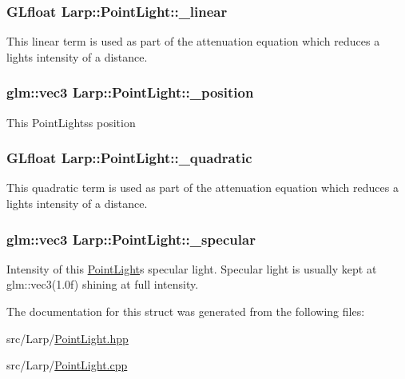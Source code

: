 \subsubsection[{\texorpdfstring{\+\_\+linear}{_linear}}]{\setlength{\rightskip}{0pt plus 5cm}G\+Lfloat Larp\+::\+Point\+Light\+::\+\_\+linear}\hypertarget{structLarp_1_1PointLight_ad1c64e128dbc6edc2b5a2cb373a3e3dc}{}\label{structLarp_1_1PointLight_ad1c64e128dbc6edc2b5a2cb373a3e3dc}
This linear term is used as part of the attenuation equation which reduces a light\textquotesingle{}s intensity of a distance. 
\subsubsection[{\texorpdfstring{\+\_\+position}{_position}}]{\setlength{\rightskip}{0pt plus 5cm}glm\+::vec3 Larp\+::\+Point\+Light\+::\+\_\+position}\hypertarget{structLarp_1_1PointLight_a5a5dfbb7a5f9225264de04c7f2057188}{}\label{structLarp_1_1PointLight_a5a5dfbb7a5f9225264de04c7f2057188}
This Point\+Lights\textquotesingle{}s position 
\subsubsection[{\texorpdfstring{\+\_\+quadratic}{_quadratic}}]{\setlength{\rightskip}{0pt plus 5cm}G\+Lfloat Larp\+::\+Point\+Light\+::\+\_\+quadratic}\hypertarget{structLarp_1_1PointLight_af4385e38db129e0fc4b1af9c8bd6bfec}{}\label{structLarp_1_1PointLight_af4385e38db129e0fc4b1af9c8bd6bfec}
This quadratic term is used as part of the attenuation equation which reduces a light\textquotesingle{}s intensity of a distance. 
\subsubsection[{\texorpdfstring{\+\_\+specular}{_specular}}]{\setlength{\rightskip}{0pt plus 5cm}glm\+::vec3 Larp\+::\+Point\+Light\+::\+\_\+specular}\hypertarget{structLarp_1_1PointLight_a9f649b8dba0654cec63d2ae78c981706}{}\label{structLarp_1_1PointLight_a9f649b8dba0654cec63d2ae78c981706}
Intensity of this \hyperlink{structLarp_1_1PointLight}{Point\+Light}\textquotesingle{}s specular light. Specular light is usually kept at glm\+::vec3(1.\+0f) shining at full intensity. 

The documentation for this struct was generated from the following files\+:\begin{DoxyCompactItemize}
\item 
src/\+Larp/\hyperlink{PointLight_8hpp}{Point\+Light.\+hpp}\item 
src/\+Larp/\hyperlink{PointLight_8cpp}{Point\+Light.\+cpp}\end{DoxyCompactItemize}
